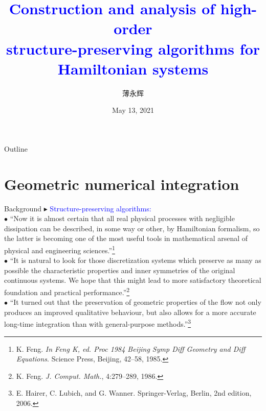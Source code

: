 \documentclass[10pt]{beamer}
\title[Structure-preserving algorithms]{\Large\textbf{\textcolor{blue}{Construction and analysis of high-order\\ structure-preserving algorithms for\\ Hamiltonian systems}}}
\author[Y.H. Bo, W.J. Cai and Y.S. Wang]{\large 薄永辉}
\institute[]{{\footnotesize\large Supervisors\\ \vspace{4mm}\large 王雨顺\quad 蔡文君}\\
\vspace{4mm}\large 南京师范大学\quad 数学科学学院}
\date{May 13, 2021}
\begin{document}
\setlength{\parindent}{0pt}
\begin{frame}{}
\titlepage
\end{frame}
\begin{frame}{Outline}
\tableofcontents
\end{frame}

\section{Geometric numerical integration}
\begin{frame}{Background}
\textcolor[rgb]{0,0,1}{$\blacktriangleright$} \textcolor{blue}{Structure-preserving algorithms:}\\
\vspace{2mm}
\quad\textcolor[rgb]{0,0,1}{$\bullet$} ``Now it is almost certain that all real physical processes with negligible dissipation can be described, in some way or other, by Hamiltonian formalism, so the latter is becoming one of the most useful tools in mathematical arsenal of physical and engineering sciences.''\footnote{K. Feng. {\em In Feng K, ed. Proc 1984 Beijing Symp Diff Geometry and Diff Equations}. Science Press, Beijing, 42--58, 1985.}\\
\vspace{2mm}
\quad\textcolor[rgb]{0,0,1}{$\bullet$} ``It is natural to look for those discretization systems which preserve as many as possible the characteristic properties and inner symmetries of the original continuous systems. We hope that this might lead to more satisfactory theoretical foundation and practical performance.''\footnote{K. Feng. {\em J. Comput. Math.}, 4:279--289, 1986.}\\
\vspace{2mm}
\quad\textcolor[rgb]{0,0,1}{$\bullet$} ``It turned out that the preservation of geometric properties of the flow not only produces an improved qualitative behaviour, but also allows for a more accurate long-time integration than with general-purpose methods.''\footnote{E. Hairer, C. Lubich, and G. Wanner. Springer-Verlag, Berlin, 2nd edition, 2006.}
\end{frame}
\end{document}
